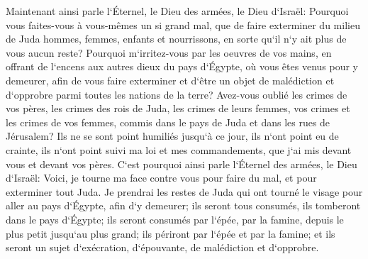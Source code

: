 \verse Maintenant ainsi parle l`Éternel, le Dieu des armées, le Dieu d`Israël: Pourquoi vous faites-vous à vous-mêmes un si grand mal, que de faire exterminer du milieu de Juda hommes, femmes, enfants et nourrissons, en sorte qu`il n`y ait plus de vous aucun reste? 
\verse Pourquoi m`irritez-vous par les oeuvres de vos mains, en offrant de l`encens aux autres dieux du pays d`Égypte, où vous êtes venus pour y demeurer, afin de vous faire exterminer et d`être un objet de malédiction et d`opprobre parmi toutes les nations de la terre? 
\verse Avez-vous oublié les crimes de vos pères, les crimes des rois de Juda, les crimes de leurs femmes, vos crimes et les crimes de vos femmes, commis dans le pays de Juda et dans les rues de Jérusalem? 
\verse Ils ne se sont point humiliés jusqu`à ce jour, ils n`ont point eu de crainte, ils n`ont point suivi ma loi et mes commandements, que j`ai mis devant vous et devant vos pères. 
\verse C`est pourquoi ainsi parle l`Éternel des armées, le Dieu d`Israël: Voici, je tourne ma face contre vous pour faire du mal, et pour exterminer tout Juda. 
\verse Je prendrai les restes de Juda qui ont tourné le visage pour aller au pays d`Égypte, afin d`y demeurer; ils seront tous consumés, ils tomberont dans le pays d`Égypte; ils seront consumés par l`épée, par la famine, depuis le plus petit jusqu`au plus grand; ils périront par l`épée et par la famine; et ils seront un sujet d`exécration, d`épouvante, de malédiction et d`opprobre. 

